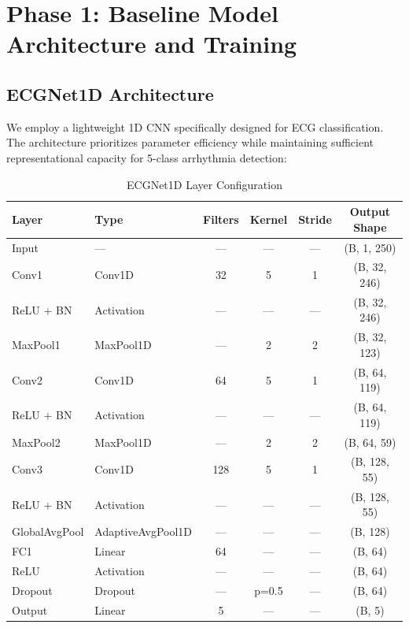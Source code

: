 \documentclass[12pt, a4paper]{article}
\begin{document}
\section{Phase 1: Baseline Model Architecture and Training}

\subsection{ECGNet1D Architecture}

We employ a lightweight 1D CNN specifically designed for ECG classification. The architecture prioritizes parameter efficiency while maintaining sufficient representational capacity for 5-class arrhythmia detection:

\begin{table}[H]
\centering
\caption{ECGNet1D Layer Configuration}
\begin{tabular}{llcccc}
\toprule
\textbf{Layer} & \textbf{Type} & \textbf{Filters} & \textbf{Kernel} & \textbf{Stride} & \textbf{Output Shape} \\
\midrule
Input & — & — & — & — & (B, 1, 250) \\
Conv1 & Conv1D & 32 & 5 & 1 & (B, 32, 246) \\
ReLU + BN & Activation & — & — & — & (B, 32, 246) \\
MaxPool1 & MaxPool1D & — & 2 & 2 & (B, 32, 123) \\
Conv2 & Conv1D & 64 & 5 & 1 & (B, 64, 119) \\
ReLU + BN & Activation & — & — & — & (B, 64, 119) \\
MaxPool2 & MaxPool1D & — & 2 & 2 & (B, 64, 59) \\
Conv3 & Conv1D & 128 & 5 & 1 & (B, 128, 55) \\
ReLU + BN & Activation & — & — & — & (B, 128, 55) \\
GlobalAvgPool & AdaptiveAvgPool1D & — & — & — & (B, 128) \\
FC1 & Linear & 64 & — & — & (B, 64) \\
ReLU & Activation & — & — & — & (B, 64) \\
Dropout & Dropout & — & p=0.5 & — & (B, 64) \\
Output & Linear & 5 & — & — & (B, 5) \\
\bottomrule
\end{tabular}
\label{tab:architecture}
\end{table}
\end{document}
